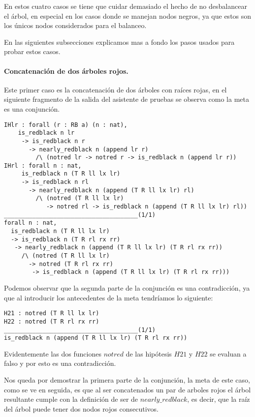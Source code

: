 En estos cuatro casos se tiene que cuidar demasiado el hecho de no desbalancear el \'arbol, en
especial en los casos donde se manejan nodos negros, ya que estos son los únicos nodos
considerados para el balanceo.

En las siguientes subsecciones explicamos mas a fondo los pasos usados para probar estos casos.


\paragraph{Concatenaci\'on de dos \'arboles rojos.}

Este primer caso es la concatenaci\'on de dos \'arboles con raíces rojas, en el siguiente
fragmento de la salida del asistente de pruebas se observa como la meta es una conjunci\'on.

\begin{verbatim}
IHlr : forall (r : RB a) (n : nat),
    is_redblack n lr
     -> is_redblack n r
       -> nearly_redblack n (append lr r)
         /\ (notred lr -> notred r -> is_redblack n (append lr r))
IHrl : forall n : nat,
     is_redblack n (T R ll lx lr)
     -> is_redblack n rl
       -> nearly_redblack n (append (T R ll lx lr) rl)
         /\ (notred (T R ll lx lr)
            -> notred rl -> is_redblack n (append (T R ll lx lr) rl))
______________________________________(1/1)
forall n : nat,
  is_redblack n (T R ll lx lr)
  -> is_redblack n (T R rl rx rr)
   -> nearly_redblack n (append (T R ll lx lr) (T R rl rx rr))
     /\ (notred (T R ll lx lr)
       -> notred (T R rl rx rr)
        -> is_redblack n (append (T R ll lx lr) (T R rl rx rr)))
\end{verbatim}

Podemos observar que la segunda parte de la conjunci\'on es una contradicci\'on, ya que al
introducir los antecedentes de la meta tendríamos lo siguiente:

\begin{verbatim}
H21 : notred (T R ll lx lr)
H22 : notred (T R rl rx rr)
______________________________________(1/1)
is_redblack n (append (T R ll lx lr) (T R rl rx rr))
\end{verbatim}

Evidentemente las dos funciones $notred$ de las hip\'otesis $H21$ y $H22$ se evaluan a falso y por
esto es una contradicci\'on.

Nos queda por demostrar la primera parte de la conjunci\'on, la meta de este caso, como se ve en
seguida, es que al ser concatenados un par de arboles rojos el árbol resultante cumple con la
definici\'on de ser de $nearly\_redblack$, es decir, que la raíz del \'arbol puede tener dos nodos
rojos consecutivos.

